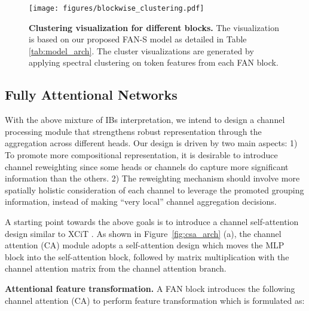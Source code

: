 \documentclass[nohyperref]{article}
\theoremstyle{plain}
\theoremstyle{definition}
\theoremstyle{remark}
\begin{document}
\begin{figure}[t] 
	\centering
	\texttt{[image: figures/blockwise\_clustering.pdf]}
	\vspace{-6mm}
	\caption{\textbf{Clustering visualization for different blocks.} The visualization is based on our proposed FAN-S model as detailed in  Table \ref{tab:model_arch}. The cluster visualizations are generated by applying spectral clustering on token features from each FAN block.}
	\label{fig:clustering_visualization}
	\vspace{-3mm}
\end{figure}


















\subsection{Fully Attentional Networks}

With the above mixture of IBs interpretation, we intend to design a channel processing module that strengthens robust representation through the aggregation across different heads. Our design is driven by two main aspects: 1) To promote more compositional representation, it is desirable to introduce channel reweighting since some heads or channels do capture more significant information than the others. 2) The reweighting mechanism should involve more spatially holistic consideration of each channel to leverage the promoted grouping information, instead of making ``very local'' channel aggregation decisions.


A starting point towards the above goals is to introduce a channel self-attention design similar to XCiT \cite{el2021xcit}. As shown in Figure~\ref{fig:csa_arch} (a), the channel attention (CA) module adopts a self-attention design which moves the MLP block into the self-attention block, followed by matrix multiplication with the  channel attention matrix from the channel attention branch.



\textbf{Attentional feature transformation.} A FAN block introduces the following channel attention (CA) to perform feature transformation which is formulated as:

\vspace{-0.4cm}
\begin{small}

\end{small}
\end{document}
